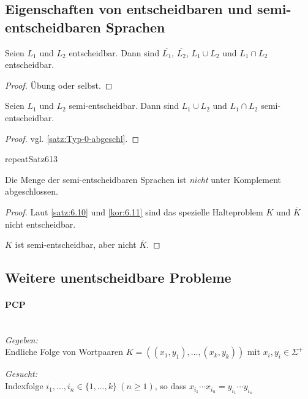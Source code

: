 \subsection{Eigenschaften von entscheidbaren und semi-entscheidbaren Sprachen}
\begin{Satz}[name={[Eigenschaften von Entscheidbarkeit]}]
\label{thm:eigensch-von-entsch}
  Seien $L_1$ und $L_2$ entscheidbar. Dann sind $\overline{L_1}$, $\overline{L_2}$, $L_1 \cup L_2$ und $L_1 \cap L_2$ entscheidbar.
\end{Satz}\vspace{-1.5em}
\begin{proof}
  Übung oder selbst.
\end{proof}
\begin{Satz}[name={[Eigenschaften von Semi-Entscheidbarkeit]}]
  Seien $L_1$ und $L_2$ semi-entscheidbar. Dann sind $L_1 \cup L_2$ und $L_1 \cap L_2$ semi-entscheidbar.
\end{Satz}
\begin{proof}
  vgl. \autoref{satz:Typ-0-abgeschl}.
\end{proof}
\csname repeatSatz613\endcsname*
\begin{Satz}
  Die Menge der semi-entscheidbaren Sprachen ist \emph{nicht}
  unter Komplement abgeschlossen.
\end{Satz}
\begin{proof}
  Laut \autoref{satz:6.10} und \autoref{kor:6.11} sind das spezielle Halteproblem $K$ und $\overline{K}$ nicht entscheidbar.
  
  $K$ ist semi-entscheidbar, aber nicht $\overline{K}$.
\end{proof}


\subsection{Weitere unentscheidbare Probleme}
\paragraph[\acf*{PCP}]{\acf{PCP}}\ \\
\emph{Gegeben:}\\
Endliche Folge von Wortpaaren $K=((x_1, y_1), \dots, (x_k, y_k))$ mit $x_i, y_i \in \Sigma^+$

\emph{Gesucht:}\\
Indexfolge $i_1, \dots, i_n \in \{1, \dots, k\}\ (n \geq 1)$, so dass $x_{i_1} \cdots x_{i_n}=y_{i_1} \cdots y_{i_n}$


